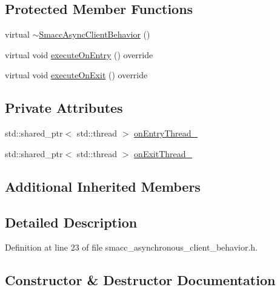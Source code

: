 \subsection*{Protected Member Functions}
\begin{DoxyCompactItemize}
\item 
virtual \hyperlink{classsmacc_1_1SmaccAsyncClientBehavior_a0028345c409db6fdead7a16b23b9f0aa}{$\sim$\+Smacc\+Async\+Client\+Behavior} ()
\item 
virtual void \hyperlink{classsmacc_1_1SmaccAsyncClientBehavior_ab8ca63d40d61554263466fe4c0b5cbd1}{execute\+On\+Entry} () override
\item 
virtual void \hyperlink{classsmacc_1_1SmaccAsyncClientBehavior_a3d982d370df4f133ad37c0b2370e9b82}{execute\+On\+Exit} () override
\end{DoxyCompactItemize}
\subsection*{Private Attributes}
\begin{DoxyCompactItemize}
\item 
std\+::shared\+\_\+ptr$<$ std\+::thread $>$ \hyperlink{classsmacc_1_1SmaccAsyncClientBehavior_a8b7bacf092d8b4de0bb3764bae43c181}{on\+Entry\+Thread\+\_\+}
\item 
std\+::shared\+\_\+ptr$<$ std\+::thread $>$ \hyperlink{classsmacc_1_1SmaccAsyncClientBehavior_af2e2b5e95d8281c605fa06e51aad5d00}{on\+Exit\+Thread\+\_\+}
\end{DoxyCompactItemize}
\subsection*{Additional Inherited Members}


\subsection{Detailed Description}


Definition at line 23 of file smacc\+\_\+asynchronous\+\_\+client\+\_\+behavior.\+h.



\subsection{Constructor \& Destructor Documentation}
\mbox{\label{classsmacc_1_1SmaccAsyncClientBehavior_a0028345c409db6fdead7a16b23b9f0aa}} 
